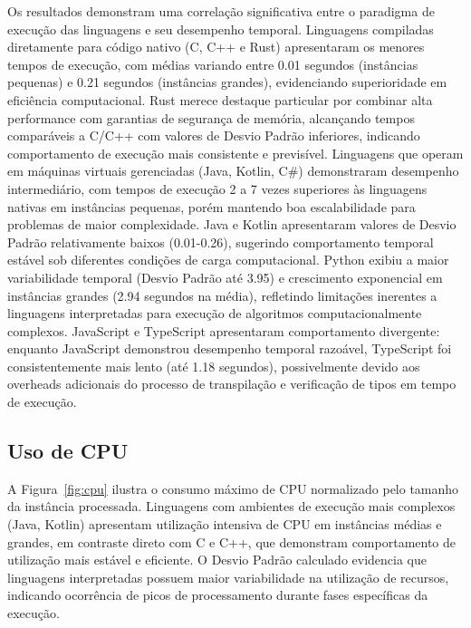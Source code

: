 \documentclass[12pt,a4paper]{article}
\begin{document}
Os resultados demonstram uma correlação significativa entre o paradigma de execução das linguagens e seu desempenho temporal. Linguagens compiladas diretamente para código nativo (C, C++ e Rust) apresentaram os menores tempos de execução, com médias variando entre 0.01 segundos (instâncias pequenas) e 0.21 segundos (instâncias grandes), evidenciando superioridade em eficiência computacional. Rust merece destaque particular por combinar alta performance com garantias de segurança de memória, alcançando tempos comparáveis a C/C++ com valores de Desvio Padrão inferiores, indicando comportamento de execução mais consistente e previsível.
Linguagens que operam em máquinas virtuais gerenciadas (Java, Kotlin, C#) demonstraram desempenho intermediário, com tempos de execução 2 a 7 vezes superiores às linguagens nativas em instâncias pequenas, porém mantendo boa escalabilidade para problemas de maior complexidade. Java e Kotlin apresentaram valores de Desvio Padrão relativamente baixos (0.01-0.26), sugerindo comportamento temporal estável sob diferentes condições de carga computacional.
Python exibiu a maior variabilidade temporal (Desvio Padrão até 3.95) e crescimento exponencial em instâncias grandes (2.94 segundos na média), refletindo limitações inerentes a linguagens interpretadas para execução de algoritmos computacionalmente complexos. JavaScript e TypeScript apresentaram comportamento divergente: enquanto JavaScript demonstrou desempenho temporal razoável, TypeScript foi consistentemente mais lento (até 1.18 segundos), possivelmente devido aos overheads adicionais do processo de transpilação e verificação de tipos em tempo de execução.

\subsection{Uso de CPU}
A Figura~\ref{fig:cpu} ilustra o consumo máximo de CPU normalizado pelo tamanho da instância processada. Linguagens com ambientes de execução mais complexos (Java, Kotlin) apresentam utilização intensiva de CPU em instâncias médias e grandes, em contraste direto com C e C++, que demonstram comportamento de utilização mais estável e eficiente. O Desvio Padrão calculado evidencia que linguagens interpretadas possuem maior variabilidade na utilização de recursos, indicando ocorrência de picos de processamento durante fases específicas da execução.
\end{document}
